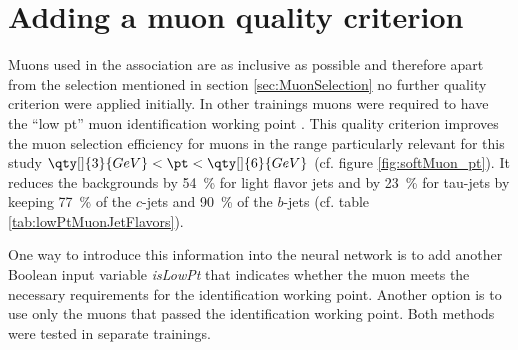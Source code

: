 \section{Adding a muon quality criterion}
Muons used in the association are as inclusive as possible and therefore apart from the selection mentioned in section \ref{sec:MuonSelection} no further quality criterion were applied initially. In other trainings muons were required to have the  ``low pt'' muon identification working point \citep{ATL-PHYS-PUB-2020-002}. This quality criterion improves the muon selection efficiency for muons in the range particularly relevant for this study $\qty[]{3}{GeV}<\pt < \qty[]{6}{GeV}$ (cf. figure \ref{fig:softMuon_pt}). It reduces the backgrounds by \qty{54}{\percent} for light flavor jets and by \qty{23}{\percent} for tau-jets by keeping \qty{77}{\percent} of the $c$-jets and \qty{90}{\percent} of the $b$-jets (cf. table \ref{tab:lowPtMuonJetFlavors}).
\begin{table}[]
  \caption{Fraction of associated low pt working point muons per flavor. Fraction of low pt muons to all associated muons (fractions to table \ref{tab:MuonJetFlavors}), the fraction of muons kept after applying the working point. }%
  \label{tab:lowPtMuonJetFlavors}
  \centering
\end{table}
One way to introduce this information into the neural network is to add another Boolean input variable \textit{isLowPt} that indicates whether the muon meets the necessary requirements for the identification working point. Another option is to use only the muons that passed the identification working point. Both methods were tested in separate trainings.

